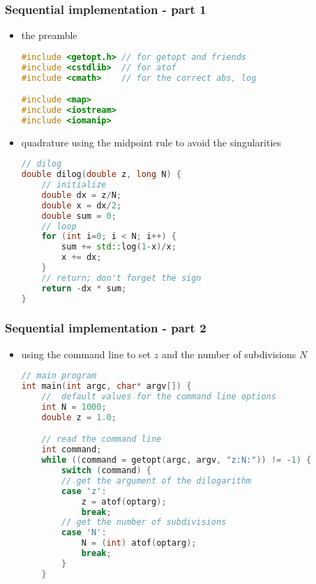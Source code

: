 \begin{frame}[fragile]
%
  \frametitle{Sequential implementation - part 1}
%
  \begin{itemize}
  \item the preamble
  \begin{lstlisting}[language=c++,name=sequential]
#include <getopt.h> // for getopt and friends
#include <cstdlib>  // for atof
#include <cmath>    // for the correct abs, log

#include <map>
#include <iostream>
#include <iomanip>
  \end{lstlisting}
%
  \item quadrature using the midpoint rule to avoid the singularities
  \begin{lstlisting}[language=c++,name=sequential]
// dilog
double dilog(double z, long N) {
    // initialize
    double dx = z/N;
    double x = dx/2;
    double sum = 0;
    // loop
    for (int i=0; i < N; i++) {
        sum += std::log(1-x)/x;
        x += dx;
    }
    // return; don't forget the sign
    return -dx * sum;
}

  \end{lstlisting}
%
  \end{itemize}
%
\end{frame}

\begin{frame}[fragile]
%
  \frametitle{Sequential implementation - part 2}
%
  \begin{itemize}
  \item using the command line to set $z$ and the number of subdivisions $N$
  \begin{lstlisting}[language=c++,name=sequential]
// main program
int main(int argc, char* argv[]) {
    //  default values for the command line options
    int N = 1000;
    double z = 1.0;

    // read the command line
    int command;
    while ((command = getopt(argc, argv, "z:N:")) != -1) {
        switch (command) {
        // get the argument of the dilogarithm 
        case 'z':
            z = atof(optarg);
            break;
        // get the number of subdivisions
        case 'N':
            N = (int) atof(optarg);
            break;
        }
    }
  \end{lstlisting}
%
  \end{itemize}
%
\end{frame}

